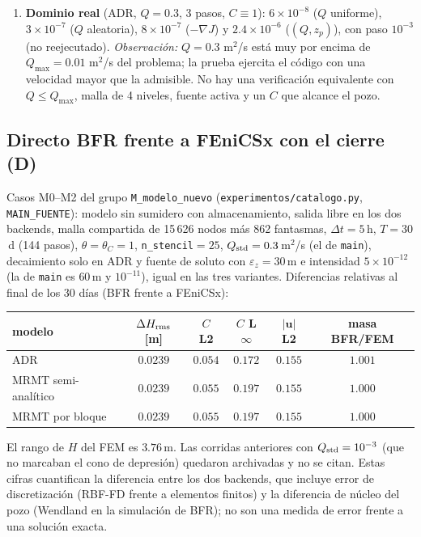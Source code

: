 \documentclass[11pt]{article}
\numberwithin{equation}{section}
\theoremstyle{plain}
\theoremstyle{definition}
\theoremstyle{remark}
\newcommand{\bu}{\mathbf{u}}
\begin{document}
\begin{enumerate}[label=\textbf{V\arabic*.},leftmargin=*,itemsep=0.6em]
\item \textbf{Dominio real} (ADR, $Q=0.3$, 3 pasos, $C\equiv1$): $6\times10^{-8}$ ($Q$ uniforme), $3\times10^{-7}$
  ($Q$ aleatoria), $8\times10^{-7}$ ($-\nabla J$) y $2.4\times10^{-6}$ ($(Q,z_p)$), con paso $10^{-3}$ (no reejecutado). \emph{Observación:} $Q=0.3$ m$^2$/s está muy por encima de $Q_{\max}=0.01$ m$^2$/s del problema; la prueba
  ejercita el código con una velocidad mayor que la admisible. No hay una verificación equivalente con $Q\le Q_{\max}$, malla de 4 niveles, fuente activa y un $C$ que alcance el pozo.
\end{enumerate}

\subsection{Directo BFR frente a FEniCSx con el cierre (D)}\label{sec:directo}
Casos M0--M2 del grupo \texttt{M\_modelo\_nuevo} (\texttt{experimentos/catalogo.py}, \texttt{MAIN\_FUENTE}): modelo sin sumidero con almacenamiento, salida libre en los dos backends, malla compartida de 15\,626 nodos más 862 fantasmas,
$\Delta t=5$\,h, $T=30$\,d (144 pasos), $\theta=\theta_C=1$, \texttt{n\_stencil}$=25$, $Q_{\rm std}=0.3$\,m$^2$/s (el de \texttt{main}), decaimiento solo en ADR y fuente de soluto con $\varepsilon_z=30$\,m e intensidad $5\times10^{-12}$ (la de \texttt{main} es $60$\,m y $10^{-11}$), igual en las tres variantes.
Diferencias relativas al final de los 30 días (BFR frente a FEniCSx):
\begin{center}\small
\begin{tabular}{lccccc}
\toprule
modelo & $\Delta H_{\rm rms}$ [m] & $C$ L2 & $C$ L$\infty$ & $|\bu|$ L2 & masa BFR/FEM \\
\midrule
ADR & $0.0239$ & $0.054$ & $0.172$ & $0.155$ & $1.001$ \\
MRMT semi-analítico & $0.0239$ & $0.055$ & $0.197$ & $0.155$ & $1.000$ \\
MRMT por bloque & $0.0239$ & $0.055$ & $0.197$ & $0.155$ & $1.000$ \\
\bottomrule
\end{tabular}
\end{center}
El rango de $H$ del FEM es $3.76$\,m. Las corridas anteriores con $Q_{\rm std}=10^{-3}$ (que no marcaban el cono de depresión) quedaron archivadas y no se citan. Estas cifras cuantifican la diferencia entre los dos backends, que incluye error de discretización (RBF-FD frente a elementos finitos) y la diferencia de núcleo del pozo (Wendland en la simulación de BFR); no son una medida de error frente a una solución exacta.
\end{document}
